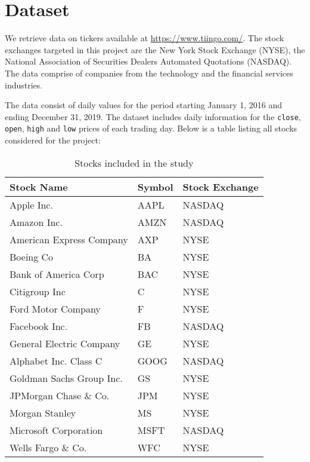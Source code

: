 \section{Dataset}
We retrieve data on tickers available at \url{https://www.tiingo.com/}. The stock exchanges targeted in this project are the New York Stock Exchange (NYSE), the National Association of Securities Dealers Automated Quotations (NASDAQ). The data comprise of companies from the technology and the financial services industries.

The data consist of daily values for the period starting January 1, 2016 and ending December 31, 2019. The dataset includes daily information for the \texttt{close}, \texttt{open}, \texttt{high} and \texttt{low} prices of each trading day. Below is a table listing all stocks considered for the project:

\begin{table}[h]
    \centering
    \begin{tabular}{|l|l|l|}
        \hline
        \textbf{Stock Name}      & \textbf{Symbol} & \textbf{Stock Exchange} \\ \hline
        Apple Inc.               & AAPL            & NASDAQ                  \\ \hline
        Amazon Inc.              & AMZN            & NASDAQ                  \\ \hline
        American Express Company & AXP             & NYSE                    \\ \hline
        Boeing Co                & BA              & NYSE                    \\ \hline
        Bank of America Corp     & BAC             & NYSE                    \\ \hline
        Citigroup Inc            & C               & NYSE                    \\ \hline
        Ford Motor Company       & F               & NYSE                    \\ \hline
        Facebook Inc.            & FB              & NASDAQ                  \\ \hline
        General Electric Company & GE              & NYSE                    \\ \hline
        Alphabet Inc. Class C    & GOOG            & NASDAQ                  \\ \hline
        Goldman Sachs Group Inc. & GS              & NYSE                    \\ \hline
        JPMorgan Chase \& Co.    & JPM             & NYSE                    \\ \hline
        Morgan Stanley           & MS              & NYSE                    \\ \hline
        Microsoft Corporation    & MSFT            & NASDAQ                  \\ \hline
        Wells Fargo \& Co.       & WFC             & NYSE                    \\ \hline
    \end{tabular}
    \caption{Stocks included in the study}
    \label{tab:stocks_included}
\end{table}

